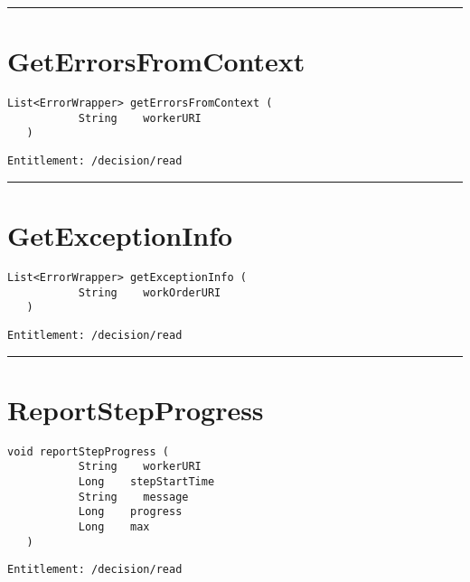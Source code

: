 \rule{12cm}{2pt}
\section{GetErrorsFromContext}
\label{Api:GetErrorsFromContext}
\begin{lstlisting}[style=nonumbers]
   List<ErrorWrapper> getErrorsFromContext (
           String    workerURI
   )
\end{lstlisting}
\begin{Verbatim}[formatcom=\color{Maroon}]
  Entitlement: /decision/read
\end{Verbatim}



\rule{12cm}{2pt}
\section{GetExceptionInfo}
\label{Api:GetExceptionInfo}
\begin{lstlisting}[style=nonumbers]
   List<ErrorWrapper> getExceptionInfo (
           String    workOrderURI
   )
\end{lstlisting}
\begin{Verbatim}[formatcom=\color{Maroon}]
  Entitlement: /decision/read
\end{Verbatim}



\rule{12cm}{2pt}
\section{ReportStepProgress}
\label{Api:ReportStepProgress}
\begin{lstlisting}[style=nonumbers]
   void reportStepProgress (
           String    workerURI
           Long    stepStartTime
           String    message
           Long    progress
           Long    max
   )
\end{lstlisting}
\begin{Verbatim}[formatcom=\color{Maroon}]
  Entitlement: /decision/read
\end{Verbatim}



